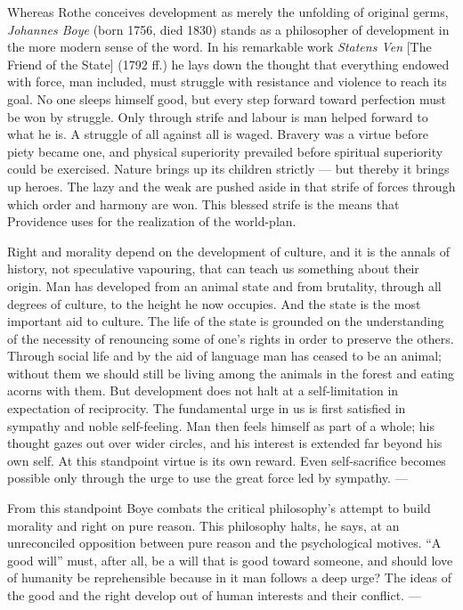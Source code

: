 \documentclass[12pt,a4paper]{book}
\newcommand{\opage}[1]{\marginnote{\footnotesize\textit{[#1]}}}
\begin{document}
\medskip

Whereas Rothe conceives development as merely the unfolding of original germs,
\emph{Johannes Boye} (born 1756, died 1830) stands as a philosopher of development in the
more modern sense of the word. In his remarkable work \emph{Statens Ven} [The Friend
of the State] (1792 ff.) he lays down the thought that everything endowed with
force, man included, must struggle with resistance and violence to reach its goal.
No one sleeps himself good, but every step forward toward perfection must be won by
struggle. Only through strife and labour is man helped forward to what he is. A
struggle of all against all is waged. Bravery was a virtue before piety became one,
and physical superiority prevailed before spiritual superiority could be exercised.
Nature brings up its children strictly --- but thereby it brings up heroes. The lazy
and the weak are pushed aside in that strife of forces through which order and
harmony are won. This blessed strife is the means that Providence uses for the
realization of the world-plan.

Right and morality depend on the development of culture, and it is the annals of
history, not speculative vapouring, that can teach us something about their origin.
Man has developed from an animal state and from brutality, through all degrees of
culture, to the height he now occupies. And the state is the most important aid to
culture. The life of the state is grounded on the understanding of the necessity of
renouncing some of one's rights in order to preserve the others. Through social life
and by the aid of language man has ceased to be an animal; without them we should
still be living among the animals in \opage{34}the forest and eating acorns with them. But
development does not halt at a self-limitation in expectation of reciprocity. The
fundamental urge in us is first satisfied in sympathy and noble self-feeling. Man
then feels himself as part of a whole; his thought gazes out over wider circles, and
his interest is extended far beyond his own self. At this standpoint virtue is its
own reward. Even self-sacrifice becomes possible only through the urge to use the
great force led by sympathy. ---

From this standpoint Boye combats the critical philosophy's attempt to build
morality and right on pure reason. This philosophy halts, he says, at an
unreconciled opposition between pure reason and the psychological motives. ``A good
will'' must, after all, be a will that is good toward someone, and should love of
humanity be reprehensible because in it man follows a deep urge? The ideas of the
good and the right develop out of human interests and their conflict. ---
\end{document}
